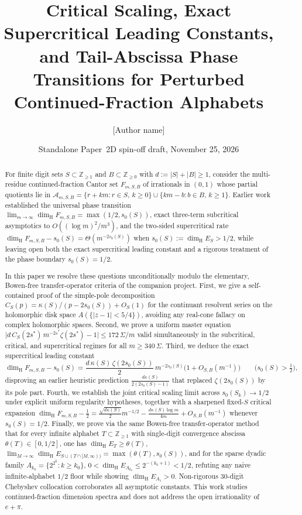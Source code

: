 \documentclass[11pt]{article}
\title{Critical Scaling, Exact Supercritical Leading Constants,\\
and Tail-Abscissa Phase Transitions for Perturbed\\
Continued-Fraction Alphabets}
\author{[Author name]\\ \relax[Affiliation]}
\date{Standalone Paper~2D spin-off draft, November 25, 2026}
\theoremstyle{definition}
\theoremstyle{remark}
\newcommand{\Z}{\mathbb{Z}}
\newcommand{\dimH}{\dim_{\mathrm{H}}}
\begin{document}
\maketitle

\begin{abstract}
For finite digit sets $S\subset\Z_{\ge1}$ and $B\subset\Z_{\ge0}$ with
$d:=|S|+|B|\ge1$, consider the multi-residue continued-fraction Cantor set
$F_{m,S,B}$ of irrationals in $(0,1)$ whose partial quotients lie in
$\mathcal A_{m,S,B}=\{r+km:r\in S,\,k\ge0\}\cup\{km-b:b\in B,\,k\ge1\}$.
Earlier work established the universal phase transition
$\lim_{m\to\infty}\dimH F_{m,S,B}=\max(1/2,s_0(S))$, exact three-term
subcritical asymptotics to $O((\log m)^2/m^3)$, and the two-sided
supercritical rate $\dimH F_{m,S,B}-s_0(S)=\Theta(m^{-2s_0(S)})$ when
$s_0(S):=\dimH E_S>1/2$, while leaving open both the exact supercritical
leading constant and a rigorous treatment of the phase boundary
$s_0(S)=1/2$.

In this paper we resolve these questions unconditionally modulo the
elementary, Bowen-free transfer-operator criteria of the companion project.
First, we give a self-contained proof of the simple-pole decomposition
$C_S(p)=\kappa(S)/(p-2s_0(S))+O_S(1)$ for the continuant resolvent series on
the holomorphic disk space $A(\{|z-1|<5/4\})$, avoiding any real-cone fallacy
on complex holomorphic spaces. Second, we prove a uniform master equation
$\bigl|d\,C_S(2s^*)\,m^{-2s^*}\zeta(2s^*)-1\bigr|\le 172\,\Sigma/m$ valid
simultaneously in the subcritical, critical, and supercritical regimes for all
$m\ge 340\,\Sigma$. Third, we deduce the exact supercritical leading constant
\[
\dimH F_{m,S,B}-s_0(S)
=\frac{d\,\kappa(S)\,\zeta(2s_0(S))}{2}\,m^{-2s_0(S)}\bigl(1+O_{S,B}(m^{-1})\bigr)
\qquad\bigl(s_0(S)>\tfrac12\bigr),
\]
disproving an earlier heuristic prediction $\frac{d\kappa(S)}{2(2s_0(S)-1)}$
that replaced $\zeta(2s_0(S))$ by its pole part. Fourth, we establish the
joint critical scaling limit across $s_0(S_k)\to 1/2$ under explicit uniform
regularity hypotheses, together with a sharpened fixed-$S$ critical expansion
$\dimH F_{m,S,B}-\frac12=\frac{\sqrt{d\kappa(S)}}{2}m^{-1/2}
-\frac{d\kappa(S)\log m}{4m}+O_{S,B}(m^{-1})$ whenever $s_0(S)=1/2$.
Finally, we prove via the same Bowen-free transfer-operator method that for
every infinite alphabet $T\subset\Z_{\ge1}$ with single-digit convergence
abscissa $\theta(T)\in[0,1/2]$, one has $\dimH E_T\ge\theta(T)$,
$\lim_{M\to\infty}\dimH E_{S\cup(T\cap[M,\infty))}=\max(\theta(T),s_0(S))$,
and for the sparse dyadic family $A_{k_0}=\{2^{2^k}:k\ge k_0\}$,
$0<\dimH E_{A_{k_0}}\le 2^{-(k_0+1)}<1/2$, refuting any naive infinite-alphabet
$1/2$ floor while showing $\dimH E_{A_1}>0$. Non-rigorous $30$-digit Chebyshev
collocation corroborates all asymptotic constants. This work studies
continued-fraction dimension spectra and does not address the open
irrationality of $e+\pi$.
\end{abstract}
\end{document}
